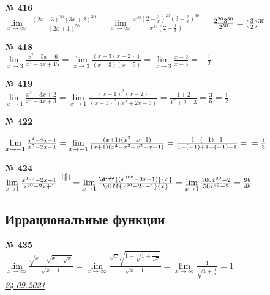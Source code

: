 \documentclass[12pt]{article}
\begin{document}
{{	}
\vspace{.5cm}
{
	{\textbf{№ 416} \vspace{.5cm}\\}
	\Large{$\lim\limits_{x \to \infty}$ $\frac{(2x-3)^{20}(3x+2)^{30}}{(2x+1)^{50}}$ = 
		$\lim\limits_{x \to \infty}\frac{x^{50}(2-\frac{3}{x})^{20}(3+\frac{2}{x})^{30}}{x^{50}(2+\frac{1}{x})}$ = $\frac{2^{20} \space 3^{30}}{2^{50}} = (\frac{3}{2})^{30}$
	}

}

\vspace{.5cm}
{
	{\textbf{№ 418} \vspace{.5cm}\\}
	\Large{$\lim\limits_{x \to 3} \frac{x^2-5x+6}{x^2-8x+15} = \lim\limits_{x \to 3} 
		\frac{(x-3(x-2))}{(x-3)(x-5)} = \lim\limits_{x \to 3} \frac{x-2}{x-5} = -\frac{1}{2}$
	}
	
}

\vspace{.5cm}
{
	{\textbf{№ 419} \vspace{.5cm}\\}
	\Large{$\lim\limits_{x \to 1} \frac{x^3-3x+2}{x^4-4x+3} = \lim\limits_{x \to 1}
		\frac{(x-1)^2(x+2)}{(x-1)^2(x^2+2x-3)}$ = $\frac{1+2}{1^2+2+3} = \frac{3}{6} = \frac{1}{2}$
	}
	
}

\vspace{.5cm}
{
	{\textbf{№ 422} \vspace{.5cm}\\}
	\Large{$\lim\limits_{x \to -1} \frac{x^3-2x-1}{x^5-2x-1} = \lim\limits_{x \to -1}
		\frac{(x+1)(x^2-x-1)}{(x+1)(x^4-x^3+x^2-x-1)} = \frac{1 - (-1)-1}{1-(-1)+1-(-1)-1}=\\=\frac{1}{3}$
		
	}
}
\vspace{.5cm}
{
	{\textbf{№ 424} \vspace{.5cm}\\}
	\Large{ $\lim\limits_{x \to 1} \frac{x^{100}-2x+1}{x^{50}-2x+1}^{\enspace [\frac{0}{0}]} = \lim\limits_{x \to 1}
		\frac{\diff{(x^{100}-2x+1)}{x}}{\diff{x^{50}-2x+1}{x}} = \lim\limits_{x \to 1}
		\frac{100x^{99}-2}{50x^{49}-2} = \frac{98}{48}$
	}
}
\newpage

}
\subsection{Иррациональные функции}
\vspace{.5cm}
{
	{\textbf{№ 435} \vspace{.5cm}\\}
	\Large{ $\lim\limits_{x \to \infty} \frac{\sqrt{x+\sqrt{x+\sqrt{x}}}}{\sqrt{x+1}}=
		\lim\limits_{x \to \infty} \frac{\sqrt{x}\sqrt{1+ \sqrt{1 + \frac{1}{\sqrt{x}}}}}{\sqrt{x+1}} = \lim\limits_{x \to \infty} \frac{1}{\sqrt{1+\frac{1}{x}}} = 1$
	}
}
\vspace{.5cm}\\
	\hspace*{\fill} \underline{\textit{24.09.2021}} \vspace{1cm}
\end{document}
